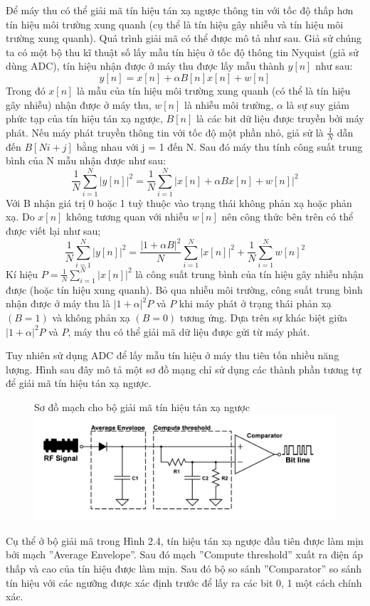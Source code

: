 \documentclass{uetgraduation}
\begin{document}
\begin{enumerate}
    Để máy thu có thể giải mã tín hiệu tán xạ ngược thông tin với tốc độ thấp hơn tín hiệu môi trường xung quanh (cụ thể là tín hiệu gây nhiễu và tín hiệu môi trường xung quanh).
    Quá trình giải mã có thể được mô tả như sau. Giả sử chúng ta có một bộ thu kĩ thuật số lấy mẫu tín hiệu ở tốc độ thông tin Nyquist (giả sử dùng ADC), tín hiệu nhận được ở máy thu được lấy mẫu
    thành $y[n]$ như sau:
    \[
    y[n] = x[n] + \alpha B[n]x[n] + w[n]
    \]
    Trong đó $x[n]$ là mẫu của tín hiệu môi trường xung quanh (có thể là tín hiệu gây nhiễu) nhận được ở máy thu, $w[n]$ là nhiễu môi trường, $\alpha$ là sự suy giảm phức tạp của
    tín hiệu tán xạ ngược, $B[n]$ là các bit dữ liệu được truyền bởi máy phát. Nếu máy phát truyền thông tin với tốc độ một phần nhỏ, giả sử là $\frac{1}{N}$ dẫn đến $B[Ni + j]$ bằng
    nhau với j = 1 đến N. Sau đó máy thu tính công suất trung bình của N mẫu nhận được như sau:
    \[
    \frac{1}{N}\sum_{i=1}^N|y[n]|^2 = \frac{1}{N}\sum_{i=1}^N|x[n] + \alpha B x[n] + w[n]|^2
    \]
    Với B nhận giá trị 0 hoặc 1 tuỳ thuộc vào trạng thái không phản xạ hoặc phản xạ. Do $x[n]$ không tương quan với nhiễu $w[n]$ nên công thức bên trên có thể được viết lại như sau;
    \[
    \frac{1}{N} \sum_{i=1}^{N}|y[n]|^2 = \frac{|1 + \alpha B|^2}{N} \sum_{i=1}^{N}|x[n]|^2 + \frac{1}{N}\sum_{i=1}^{N}w[n]^2
    \]
    Kí hiệu $P = \frac{1}{N}\sum_{i=1}^{N}|x[n]|^2$ là công suất trung bình của tín hiệu gây nhiễu nhận được (hoặc tín hiệu xung quanh). Bỏ qua nhiễu môi trường, công suất trung bình
    nhận được ở máy thu là $|1 + \alpha|^2 P$ và $P$ khi máy phát ở trạng thái phản xạ $(B = 1)$ và không phản xạ $(B = 0)$ tương ứng. Dựa trên sự khác biệt giữa $|1 + \alpha|^2 P$ 
    và $P$, máy thu có thể giải mã dữ liệu được gửi từ máy phát.

    Tuy nhiên sử dụng ADC để lấy mẫu tín hiệu ở máy thu tiêu tốn nhiều năng lượng. Hình sau đây mô tả một sơ đồ mạng chỉ sử dụng các thành phần tương tự để giải mã tín hiệu tán xạ ngược.
    \begin{figure}{Sơ đồ mạch cho bộ giải mã tín hiệu tán xạ ngược}
        \centering
        \includegraphics[scale=0.5]{backscatter_circuit}
        \label{fig:backscatter}
    \end{figure}

    Cụ thể ở bộ giải mã trong Hình 2.4, tín hiệu tán xạ ngược đầu tiên được làm mịn bởi mạch ''Average Envelope''. Sau đó mạch ''Compute threshold'' xuất ra điện áp thấp và cao của tín
    hiệu được làm mịn. Sau đó bộ so sánh ''Comparator'' so sánh tín hiệu với các ngưỡng được xác định trước để lấy ra các bit 0, 1 một cách chính xác.

\end{enumerate}
\end{document}
